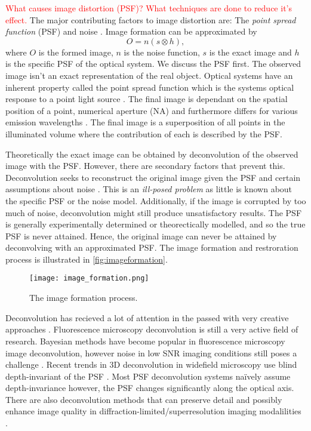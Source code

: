 \begin{definition}
	\textcolor{red}{What causes image distortion (PSF)? What techniques are done to reduce it's effect.}
	The major contributing factors to image distortion are: The \textit{point spread function} (PSF) and noise \citep{Sarder2006}.
	Image formation can be approximated by 
	\begin{equation}
		O = n(s \otimes h),
	\end{equation}
	where $O$ is the formed image, $n$ is the noise function, $s$ is the exact image and $h$ is the specific PSF of the optical system.
	We discuss the PSF first.
	The observed image isn't an exact representation of the real object.
	Optical systems have an inherent property called the point spread function which is the systems optical response to a point light source \citep{Danek2012}.
	The final image is dependant on the spatial position of a point, numerical aperture (NA) and furthermore differs for various emission wavelengths \citep{Hubeny2008,Keuper2012}.
	The final image is a superposition of all points in the illuminated volume where the contribution of each is described by the PSF.
	
	Theoretically the exact image can be obtained by deconvolution of the observed image with the PSF.
	However, there are secondary factors that prevent this.
	Deconvolution seeks to reconstruct the original image given the PSF and certain assumptions about noise \citep{Keuper2012}.
	This is an \textit{ill-posed problem} as little is known about the specific PSF or the noise model.
	Additionally, if the image is corrupted by too much of noise, deconvolution might still produce unsatisfactory results.
	The PSF is generally experimentally determined or theorectically modelled, and so the true PSF is never attained.
	Hence, the original image can never be attained by deconvolving with an approximated PSF.
	The image formation and restroration process is illustrated in \autoref{fig:imageformation}.
	
	\begin{figure}[!t]
		\centering
		\texttt{[image: image\_formation.png]}
		\caption{The image formation process.}
		\label{fig:imageformation}
	\end{figure}
	
	Deconvolution has recieved a lot of attention in the passed with very creative approaches \citep{Mukamel2012,Verveer2007,Periasamy1999,Swedlow2007,Rooi2014}.
	Fluorescence microscopy deconvolution is still a very active field of research.
	Bayesian methods have become popular in fluorescence microscopy image deconvolution, however noise in low SNR imaging conditions still poses a challenge \citep{Wong2015}.
	Recent trends in 3D deconvolution in widefield microscopy use blind depth-invariant of the PSF \citep{Kim2015}.
	Most PSF deconvolution systems na{\"i}vely assume depth-invariance however, the PSF changes significantly along the optical axis.
	There are also deconvolution methods that can preserve detail and possibly enhance image quality in diffraction-limited/superresolution imaging modalilities \citep{Qin2016}.
\end{definition}


